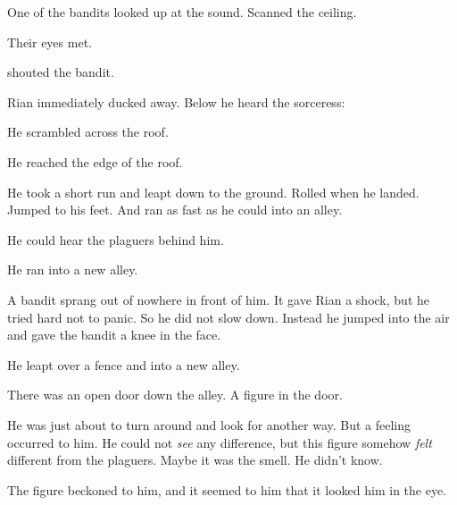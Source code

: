 
One of the bandits looked up at the sound. 
Scanned the ceiling. 

Their eyes met. 


 shouted the bandit. 

Rian immediately ducked away. 
Below he heard the sorceress: 

He scrambled across the roof. 

He reached the edge of the roof. 

He took a short run and leapt down to the ground. 
Rolled when he landed. 
Jumped to his feet. 
And ran as fast as he could into an alley. 

He could hear the plaguers behind him. 

He ran into a new alley. 


A bandit sprang out of nowhere in front of him. 
It gave Rian a shock, but he tried hard not to panic. 
So he did not slow down. 
Instead he jumped into the air and gave the bandit a knee in the face. 


He leapt over a fence and into a new alley. 


There was an open door down the alley. 
A figure in the door. 


He was just about to turn around and look for another way.
But a feeling occurred to him. 
He could not \emph{see} any difference, but this figure somehow \emph{felt} different from the plaguers. 
Maybe it was the smell. 
He didn't know. 

The figure beckoned to him, and it seemed to him that it looked him in the eye. 

